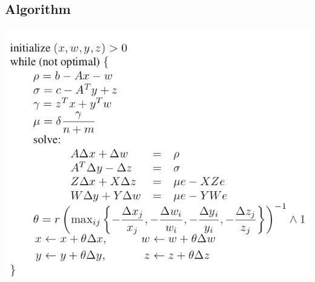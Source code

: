 \documentclass[11pt]{article}
\begin{document}
\subsection{Algorithm}
\label{sec:orge70271a}
\begin{center}
\includegraphics[width=.9\linewidth]{A Path-Following Method/screenshot_2019-03-11_16-45-48.png}
\end{center}
\end{document}
